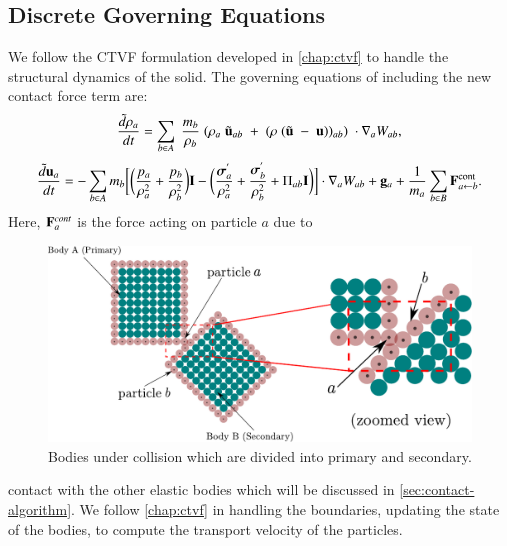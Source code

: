\subsection{Discrete Governing Equations}
\label{sec:discrete-governing-equations}
We follow the CTVF formulation developed in \cref{chap:ctvf} to handle the
structural dynamics of the solid. The governing equations of including the new
contact force term are:
\begin{equation}
\label{eqn:sph-continuity}
  \frac{\tilde{d}\rho_a}{dt} = \sum_{b \in A} \; \frac{m_b}{\rho_{b}} \; (
  \rho_{a} \; \tilde{\mathbf{u}}_{ab} \; + \;
  (\rho \; (\tilde{\mathbf{u}} \; - \;
  \mathbf{u}))_{ab}) \; \cdot \nabla_{a} W_{ab},
\end{equation}
\begin{equation}
\label{eqn:sph-momentum}
  \frac{\tilde{d}\mathbf{u}_{a}}{dt} = - \sum_{b \in A} m_b \bigg[
  \bigg(\frac{p_a}{\rho_a^2} + \frac{p_b}{\rho_b^2}\bigg) \mathbf{I} -
  \bigg(\frac{\boldsymbol{\sigma}^{'}_{a}}{\rho_a^2} +
  \frac{\boldsymbol{\sigma}^{'}_{b}}{\rho_b^2} + \Pi_{ab} \mathbf{I} \bigg) \bigg]  \cdot \nabla_{a} W_{ab} +
  \mathbf{g}_{a} + \frac{1}{m_a}\sum_{b \in B} \mathbf{F}^{\text{cont}}_{a \leftarrow b}.
\end{equation}
Here, $\mathbf{F}^{cont}_{a}$ is the force acting on particle $a$ due to
\begin{figure}[!htpb]
  \centering
  \includegraphics[width=1.0\textwidth]{images/csph/images/contact_force/contact_force_description}
  \caption{Bodies under collision which are divided into primary and
    secondary.}
\label{fig:bodies_under_collision}
\end{figure}
contact with the other elastic bodies which will be discussed in
\cref{sec:contact-algorithm}. We follow \cref{chap:ctvf} in handling the
boundaries, updating the state of the bodies, to compute the transport velocity
of the particles.


\FloatBarrier%

